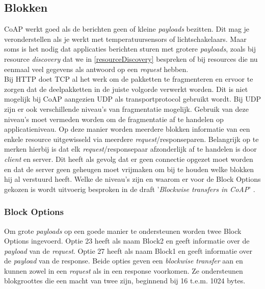 \subsection{Blokken} \label{blocks}
CoAP werkt goed als de berichten geen of kleine \textit{payloads} bezitten. Dit mag je veronderstellen als je werkt met temperatuursensors of lichtschakelaars. Maar soms is het nodig dat applicaties berichten sturen met grotere \textit{payloads}, zoals bij resource \textit{discovery} dat we in \ref{resourceDiscovery} bespreken of bij resources die nu eenmaal veel gegevens als antwoord op een \textit{request} hebben.\\

Bij HTTP doet TCP al het werk om de pakketten te fragmenteren en ervoor te zorgen dat de deelpakketten in de juiste volgorde verwerkt worden. Dit is niet mogelijk bij CoAP aangezien UDP als transportprotocol gebruikt wordt. Bij UDP zijn er ook verschillende niveau's van fragmentatie mogelijk. Gebruik van deze niveau's moet vermeden worden om de fragmentatie af te handelen op applicatieniveau. Op deze manier worden meerdere blokken informatie van een enkele resource uitgewisseld via meerdere \textit{request}/responseparen. Belangrijk op te merken hierbij is dat elk \textit{request}/responsepaar afzonderlijk af te handelen is door \textit{client} en server. Dit heeft als gevolg dat er geen connectie opgezet moet worden en dat de server geen geheugen moet vrijmaken om bij te houden welke blokken hij al verstuurd heeft. Welke de niveau's zijn en waarom er voor de Block Options gekozen is wordt uitvoerig besproken in de draft '\textit{Blockwise transfers in CoAP}' \cite{blockwiseTransfer}.

\subsubsection{Block Options}
Om grote \textit{payloads} op een goede manier te ondersteunen worden twee Block Options ingevoerd. Optie 23 heeft als naam Block2 en geeft informatie over de \textit{payload} van de \textit{request}. Optie 27 heeft als naam Block1 en geeft informatie over de \textit{payload} van de response. Beide opties  geven een \textit{blockwise transfer} aan en kunnen zowel in een \textit{request} als in een response voorkomen. Ze ondersteunen blokgroottes die een macht van twee zijn, beginnend bij 16 t.e.m. 1024 bytes.

